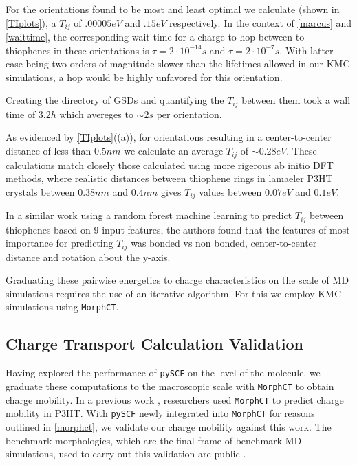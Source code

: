 For the orientations found to be most and least optimal we calculate (shown in \autoref{TIplots}),
a $T_{ij}$ of $.00005eV$ and $.15eV$ respectively. In the context of \autoref{marcus} and \autoref{waittime},
the corresponding wait time for a charge to hop between to thiophenes in these orientations is $\tau = 2
\cdot 10^{-14}s$ and $\tau = 2 \cdot 10^{-7}s$. With latter case being two orders of magnitude slower than the
lifetimes allowed in our KMC simulations, a hop would be highly unfavored for this orientation. 

Creating the directory of GSDs and quantifying the $T_{ij}$ between them took a wall time of $3.2h$ which
avereges to ${\sim}2s$ per orientation. 

As evidenced by \autoref{TIplots}((a)), for orientations resulting in a center-to-center distance of less than
$0.5nm$ we calculate an average $T_{ij}$ of ${\sim} 0.28eV$.  
These calculations match closely those
calculated using more rigerous ab initio DFT methods\cite{Lan2008},
where realistic distances between thiophene rings in lamaeler P3HT crystals 
between $0.38nm$ and $0.4 nm$ gives $T_{ij}$ values between $0.07eV$ and $0.1eV$. 

In a similar work using a random forest machine learning to predict $T_{ij}$
between thiophenes based on 9 input features, the authors found that the
features of most importance for predicting $T_{ij}$ was bonded vs non bonded,
center-to-center distance and rotation about the y-axis. \cite{Jankowski2019c}

Graduating these pairwise energetics to charge characteristics on the scale of MD simulations
requires the use of an iterative algorithm. For this we employ KMC simulations using \texttt{MorphCT}.

\subsection{Charge Transport Calculation Validation}

Having explored the performance of \texttt{pySCF} on the level of the molecule, we graduate these computations to the
macroscopic scale with \texttt{MorphCT} to obtain charge mobility.
In a previous work \cite{Miller2018}, researchers used \texttt{MorphCT} to predict charge mobility in P3HT. 
With \texttt{pySCF} newly integrated into \texttt{MorphCT} for reasons outlined in \autoref{morphct},
we validate our charge mobility against this work.
The benchmark morphologies, which are the final frame of benchmark MD simulations,
used to carry out this validation are public \cite{P3HTData}. 

